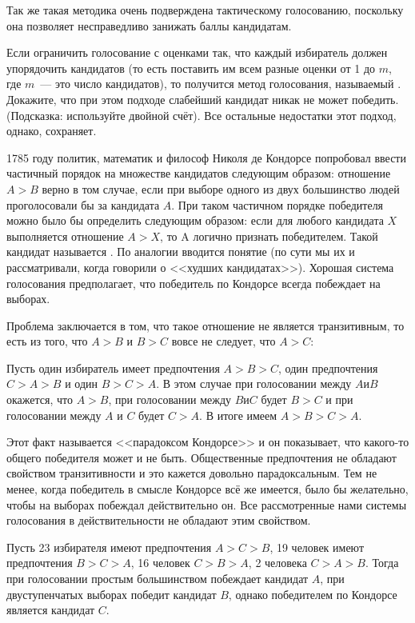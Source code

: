 Так же такая методика очень подверждена тактическому голосованию, поскольку она позволяет несправедливо занижать баллы кандидатам.

\begin{exercise}
Если ограничить голосование с оценками так, что каждый избиратель должен упорядочить кандидатов (то есть поставить им всем разные оценки от 1 до $m$, где $m$~--- это число кандидатов), то получится метод голосования, называемый . Докажите, что при этом подходе слабейший кандидат никак не может победить. (Подсказка: используйте двойной счёт). Все остальные недостатки этот подход, однако, сохраняет.
\end{exercise}

1785 году политик, математик и философ Николя де Кондорсе попробовал ввести частичный порядок на множестве кандидатов следующим образом: отношение $A>B$ верно в том случае, если при выборе одного из двух большинство людей проголосовали бы за кандидата $A$. При таком частичном порядке победителя можно было бы определить следующим образом: если для любого кандидата $X$ выполняется отношение $A>X$, то A логично признать победителем. Такой кандидат называется . По аналогии вводится понятие  (по сути мы их и рассматривали, когда говорили о <<худших кандидатах>>). Хорошая система голосования предполагает, что победитель по Кондорсе всегда побеждает на выборах.

Проблема заключается в том, что такое отношение не является транзитивным, то есть из того, что $A>B$ и $B>C$ вовсе не следует, что $A>C$:

\begin{example}
Пусть один избиратель имеет предпочтения $A>B>C$, один предпочтения $C>A>B$ и один $B>C>A$. В этом случае при голосовании между $A и B$ окажется, что $A>B$, при голосовании между $B и C$ будет $B>C$ и при голосовании между $A$ и $C$ будет $C>A$. В итоге имеем $A>B>C>A$.
\end{example}

Этот факт называется <<парадоксом Кондорсе>> и он показывает, что какого-то общего победителя может и не быть. Общественные предпочтения не обладают свойством транзитивности и это кажется довольно парадоксальным. Тем не менее, когда победитель в смысле Кондорсе всё же имеется, было бы желательно, чтобы на выборах побеждал действительно он. Все рассмотренные нами системы голосования в действительности не обладают этим свойством.

\begin{example}
Пусть 23 избирателя имеют предпочтения $A>C>B$, 19 человек имеют предпочтения $B>C>A$, 16 человек $C>B>A$, 2 человека $C>A>B$. Тогда при голосовании простым большинством побеждает кандидат $A$, при двуступенчатых выборах победит кандидат $B$, однако победителем по Кондорсе является кандидат $C$.
\end{example}


